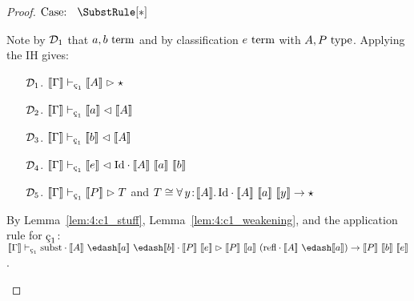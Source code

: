 \begin{proof}
    \begin{minipage}{.8\textwidth}$\text{Case: }\begin{array}{c} \SubstRule[*] \end{array}$\end{minipage}
    \begin{proofcase}
        Note by $\mathcal{D}_{1}$ that $a, b~\textnormal{term}$ and by classification $e~\textnormal{term}$ with $A, P~\textnormal{type}$.
        Applying the IH gives:
        \begin{enumerate}
            \item[$\mathcal{D}_{1}$.] $\sema{\Gamma} \vdash_{\oldced} \sema{A} \infr \star$
            \item[$\mathcal{D}_{2}$.] $\sema{\Gamma} \vdash_{\oldced} \sema{a} \chck \sema{A}$
            \item[$\mathcal{D}_{3}$.] $\sema{\Gamma} \vdash_{\oldced} \sema{b} \chck \sema{A}$
            \item[$\mathcal{D}_{4}$.] $\sema{\Gamma} \vdash_{\oldced} \sema{e} \chck \cId \cdot \sema{A}\ \sema{a}\ \sema{b}$
            \item[$\mathcal{D}_{5}$.] $\sema{\Gamma} \vdash_{\oldced} \sema{P} \infr T$ and $T \cong {\forall}\, y\! : \! \llbracket A \rrbracket.\, \textnormal{Id} \cdot \llbracket A \rrbracket\ \llbracket a \rrbracket\ \llbracket y \rrbracket \to \star$
        \end{enumerate}
        By Lemma~\ref{lem:4:c1_stuff}, Lemma~\ref{lem:4:c1_weakening}, and the application rule for $\oldced$:
            $\sema{\Gamma} \vdash_{\oldced} \csubst \cdot \sema{A}\ \edash \sema{a}\ \edash \sema{b} \cdot \sema{P}\ \sema{e} \infr \sema{P}\ \sema{a}\ (\crefl \cdot \sema{A}\ \edash \sema{a}) \to \sema{P}\ \sema{b}\ \sema{e}$.
    \end{proofcase}


\end{proof}
